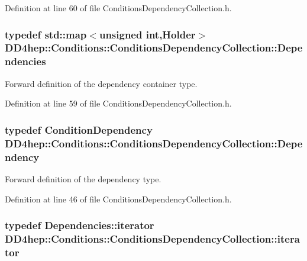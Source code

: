 Definition at line 60 of file ConditionsDependencyCollection.h.\hypertarget{class_d_d4hep_1_1_conditions_1_1_conditions_dependency_collection_a7fb4072b6036f59389b929e312e2679c}{
\subsubsection[{Dependencies}]{\setlength{\rightskip}{0pt plus 5cm}typedef std::map$<$unsigned int,{\bf Holder}$>$ {\bf DD4hep::Conditions::ConditionsDependencyCollection::Dependencies}}}
\label{class_d_d4hep_1_1_conditions_1_1_conditions_dependency_collection_a7fb4072b6036f59389b929e312e2679c}


Forward definition of the dependency container type. 

Definition at line 59 of file ConditionsDependencyCollection.h.\hypertarget{class_d_d4hep_1_1_conditions_1_1_conditions_dependency_collection_a87252585d3e17ae82813c039b1b47e8a}{
\subsubsection[{Dependency}]{\setlength{\rightskip}{0pt plus 5cm}typedef {\bf ConditionDependency} {\bf DD4hep::Conditions::ConditionsDependencyCollection::Dependency}}}
\label{class_d_d4hep_1_1_conditions_1_1_conditions_dependency_collection_a87252585d3e17ae82813c039b1b47e8a}


Forward definition of the dependency type. 

Definition at line 46 of file ConditionsDependencyCollection.h.\hypertarget{class_d_d4hep_1_1_conditions_1_1_conditions_dependency_collection_a685a1a6841f2fa4d70ab9a9bfb7b0b6a}{
\subsubsection[{iterator}]{\setlength{\rightskip}{0pt plus 5cm}typedef Dependencies::iterator {\bf DD4hep::Conditions::ConditionsDependencyCollection::iterator}}}
\label{class_d_d4hep_1_1_conditions_1_1_conditions_dependency_collection_a685a1a6841f2fa4d70ab9a9bfb7b0b6a}


